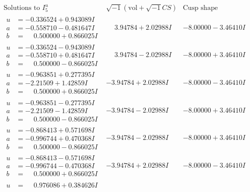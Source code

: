 \documentclass[1p]{elsarticle_modified}
\theoremstyle{definition}
\newcommand{\I}{\sqrt{-1}}
\begin{document}
$$\begin{array}{c|c|c}  
\text{Solutions to }I^u_{5}& \I (\text{vol} + \sqrt{-1}CS) & \text{Cusp shape}\\
 \hline 
\begin{aligned}
u &= -0.336524 + 0.943089 I \\
a &= -0.558710 - 0.481647 I \\
b &= \phantom{-}0.500000 + 0.866025 I\end{aligned}
 & \phantom{-}3.94784 + 2.02988 I & -8.00000 - 3.46410 I \\ \hline\begin{aligned}
u &= -0.336524 - 0.943089 I \\
a &= -0.558710 + 0.481647 I \\
b &= \phantom{-}0.500000 - 0.866025 I\end{aligned}
 & \phantom{-}3.94784 - 2.02988 I & -8.00000 + 3.46410 I \\ \hline\begin{aligned}
u &= -0.963851 + 0.277395 I \\
a &= -2.21509 + 1.42859 I \\
b &= \phantom{-}0.500000 + 0.866025 I\end{aligned}
 & -3.94784 + 2.02988 I & -8.00000 - 3.46410 I \\ \hline\begin{aligned}
u &= -0.963851 - 0.277395 I \\
a &= -2.21509 - 1.42859 I \\
b &= \phantom{-}0.500000 - 0.866025 I\end{aligned}
 & -3.94784 - 2.02988 I & -8.00000 + 3.46410 I \\ \hline\begin{aligned}
u &= -0.868413 + 0.571698 I \\
a &= -0.996744 + 0.470368 I \\
b &= \phantom{-}0.500000 - 0.866025 I\end{aligned}
 & -3.94784 - 2.02988 I & -8.00000 + 3.46410 I \\ \hline\begin{aligned}
u &= -0.868413 - 0.571698 I \\
a &= -0.996744 - 0.470368 I \\
b &= \phantom{-}0.500000 + 0.866025 I\end{aligned}
 & -3.94784 + 2.02988 I & -8.00000 - 3.46410 I \\ \hline\begin{aligned}
u &= \phantom{-}0.976086 + 0.384626 I \\

\end{aligned}
\end{array}$$
\end{document}
